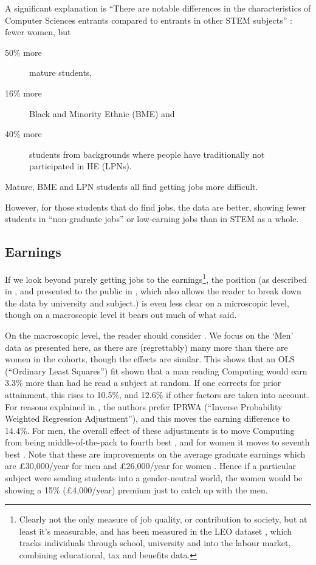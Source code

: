 \documentclass[sigconf]{acmart}
\begin{document}
A significant explanation is ``There are notable differences in the
characteristics of Computer Sciences entrants compared to entrants in
other STEM subjects'' \cite[\P2.6]{Shadbolt2016a}: fewer women, but

\begin{description}
\item[50\% more] mature students,
\item[16\% more]Black and Minority Ethnic (BME) and
\item[40\% more]students from backgrounds where people have
traditionally not participated in HE (LPNs).
\end{description}

Mature, BME and LPN students all find getting jobs more difficult.
\par However, for those students that do find jobs, the data are
better, showing \cite[Figure 6]{Shadbolt2016a} fewer students in
``non-graduate jobs'' or low-earning jobs than in STEM as a whole.

\subsection{Earnings}
If we look beyond purely getting jobs to the earnings\footnote{Clearly
not the only measure of job quality, or contribution to society, but
at least it's measurable, and has been measured in the LEO dataset
\cite{DfE2017a}, which tracks individuals through school, university
and into the labour market, combining educational, tax and benefits
data.}, the position (as described in \cite{DfE2018d}, and presented
to the public in \cite{BBC2018f}, which also allows the reader to
break down the data by university and subject.) is even less clear on
a microscopic level, though on a macroscopic level it bears out much
of what \cite{Shadbolt2016a} said.

On the macroscopic level, the reader should consider \cite[Table
5]{DfE2018d}. We focus on the `Men' data as presented here, as there
are (regrettably) many more than there are women in the cohorts,
though the effects are similar. This shows that an OLS (``Ordinary
Least Squares'') fit shown that a man reading Computing would earn
3.3\% more than had he read a subject at random. If one corrects for
prior attainment, this rises to 10.5\%, and 12.6\% if other factors
are taken into account. For reasons explained in
\cite[\S4.2]{DfE2018d}, the authors prefer IPRWA (``Inverse
Probability Weighted Regression Adjustment''), and this moves the
earning difference to 14.4\%. For men, the overall effect of these
adjustments is to move Computing from being middle-of-the-pack
\cite[Figure 15]{DfE2018d} to fourth best \cite[Figure 17]{DfE2018d},
and for women it moves to seventh best \cite[Figure
16]{DfE2018d}. Note that these are improvements on the average
graduate earnings which are \pounds30,000/year for men and
\pounds26,000/year for women \cite[p. 37]{DfE2018d}. Hence if a
particular subject were sending students into a gender-neutral world,
the women would be showing a 15\% (\pounds4,000/year) premium just to
catch up with the men.
\end{document}
